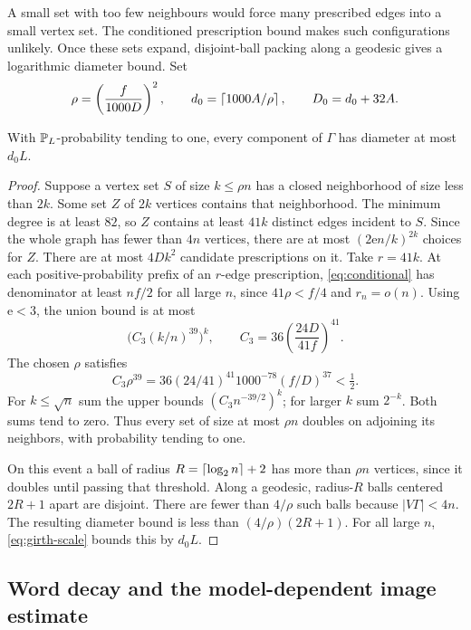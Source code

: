 A small set with too few neighbours would force many prescribed edges into a small vertex set. The conditioned prescription bound makes such configurations unlikely. Once these sets expand, disjoint-ball packing along a geodesic gives a logarithmic diameter bound.
Set
\begin{equation}\label{eq:diameter-constants}
 \rho=\left(\frac{f}{1000D}\right)^2,\qquad
 d_0=\left\lceil 1000A/\rho\right\rceil,\qquad D_0=d_0+32A.
\end{equation}
\begin{proposition}\label{prop:diameter}
With $\mathbb P_L$-probability tending to one, every component of $\Gamma$ has diameter at most $d_0L$.
\end{proposition}
\begin{proof}
Suppose a vertex set $S$ of size $k\le\rho n$ has a closed neighborhood of size less than $2k$. Some set $Z$ of $2k$ vertices contains that neighborhood. The minimum degree is at least $82$, so $Z$ contains at least $41k$ distinct edges incident to $S$. Since the whole graph has fewer than $4n$ vertices, there are at most $(2\mathrm e n/k)^{2k}$ choices for $Z$. There are at most $4Dk^2$ candidate prescriptions on it. Take $r=41k$. At each positive-probability prefix of an $r$-edge prescription, \eqref{eq:conditional} has denominator at least $nf/2$ for all large $n$, since $41\rho<f/4$ and $r_n=o(n)$. Using $\mathrm e<3$, the union bound is at most
\begin{equation}\label{eq:expansion-bound}
 \bigl(C_3(k/n)^{39}\bigr)^k,
 \qquad C_3=36\left(\frac{24D}{41f}\right)^{41}.
\end{equation}
The chosen $\rho$ satisfies
\[
 C_3\rho^{39}=36(24/41)^{41}1000^{-78}(f/D)^{37}<\tfrac12.
\]
For $k\le\sqrt n$ sum the upper bounds $(C_3n^{-39/2})^k$; for larger $k$ sum $2^{-k}$. Both sums tend to zero. Thus every set of size at most $\rho n$ doubles on adjoining its neighbors, with probability tending to one.

On this event a ball of radius $R=\left\lceil \log_2n\right\rceil+2$ has more than $\rho n$ vertices, since it doubles until passing that threshold. Along a geodesic, radius-$R$ balls centered $2R+1$ apart are disjoint. There are fewer than $4/\rho$ such balls because $|V\Gamma|<4n$. The resulting diameter bound is less than $(4/\rho)(2R+1)$. For all large $n$, \eqref{eq:girth-scale} bounds this by $d_0L$.
\end{proof}

\subsection{Word decay and the model-dependent image estimate}

